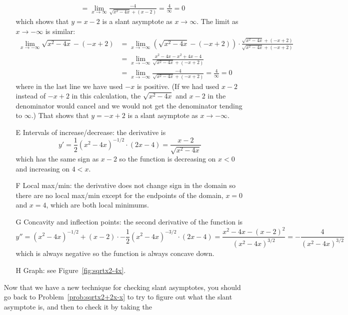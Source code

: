 \documentclass{article}
\begin{document}
\begin{enumerate}
\begin{itemize}
\begin{align*}
      &= \lim_{x\to\infty} \frac{-4}{\sqrt{x^2-4x}+(x-2)}
        = \frac{4}{\infty} =0
    \end{align*}
    which shows that $y=x-2$ is a slant asymptote as $x\to\infty$.
    The limit as $x\to -\infty$ is similar:
    \begin{align*}
      \lim_{x\to -\infty} \sqrt{x^2-4x}-(-x+2)
      &= \lim_{x\to -\infty} \left(\sqrt{x^2-4x}-(-x+2)\right)
        \cdot\frac{\sqrt{x^2-4x}+(-x+2)}{\sqrt{x^2-4x}+(-x+2)} \\
      &= \lim_{x\to -\infty} \frac{x^2-4x-x^2+4x-4}{\sqrt{x^2-4x}+(-x+2)} \\
      &= \lim_{x\to -\infty} \frac{-4}{\sqrt{x^2-4x}+(-x+2)}
        = \frac{4}{\infty} =0        
    \end{align*}
    where in the last line we have used $-x$ is positive.  (If we had
    used $x-2$ instead of $-x+2$ in this calculation, the
    $\sqrt{x^2-4x}$ and $x-2$ in the denominator would cancel and we
    would not get the denominator tending to $\infty$.)  That shows
    that $y=-x+2$ is a slant asymptote as $x\to -\infty$.
  \item[E] Intervals of increase/decrease: the derivative is
    \begin{displaymath}
      y' = \frac{1}{2} (x^2-4x)^{-1/2} \cdot (2x-4) = \frac{x-2}{\sqrt{x^2-4x}}
    \end{displaymath}
    which has the same sign as $x-2$ so the function is decreasing on
    $x<0$ and increasing on $4<x$.
  \item[F] Local max/min: the derivative does not change sign in the
    domain so there are no local max/min except for the endpoints of
    the domain, $x=0$ and $x=4$, which are both local minimums.
  \item[G] Concavity and inflection points: the second derivative of
    the function is
    \begin{displaymath}
      y''=(x^2-4x)^{-1/2}
      + (x-2) \cdot -\frac{1}{2} (x^2-4x)^{-3/2} \cdot (2x-4)
      = \frac{x^2-4x - (x-2)^2}{(x^2-4x)^{3/2}}
      = -\frac{4}{(x^2-4x)^{3/2}}
    \end{displaymath}
    which is always negative so the function is always concave down.
  \item[H] Graph: see Figure~\ref{fig:sqrtx2-4x}.
  \end{itemize}
  Now that we have a new technique for checking slant asymptotes, you
  should go back to Problem~\ref{prob:sqrtx2+2x-x} to try to figure
  out what the slant asymptote is, and then to check it by taking the

\end{enumerate}
\end{document}
